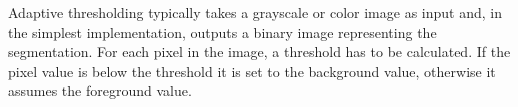 Adaptive thresholding typically takes a grayscale or color image as input and, in the simplest implementation, outputs a binary image representing the segmentation. For each pixel in the image, a threshold has to be calculated. If the pixel value is below the threshold it is set to the background value, otherwise it assumes the foreground value.
